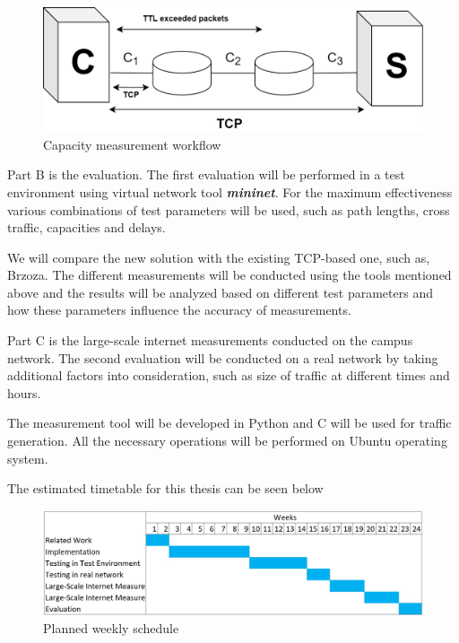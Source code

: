 \documentclass[NET,a4,12pt,ngerman]{netforms}
\begin{document}
\begin{figure}[h]
    \centering
    \includegraphics[scale=0.25]{images/NetworkDiag.png}
    \caption{Capacity measurement workflow  }
    \label{fig:mesh1}
\end{figure}


Part B is the evaluation. 
The first evaluation will be performed in a test environment using virtual network tool \textbf{\textit{mininet}}\cite{mininet}. For the maximum effectiveness various combinations of test parameters will be used, such as path lengths, cross traffic, capacities and delays.


We will compare the new solution with the existing TCP-based one, such as, Brzoza\cite{BrzozaThesis}. The different measurements will be conducted using the tools mentioned above and the results will be analyzed based on different test parameters and how these parameters influence the accuracy of measurements. 

Part C is the large-scale internet measurements conducted on the campus network. 
The second evaluation will be conducted on a real network by taking additional factors into consideration, such as size of traffic at different times and hours. 

The measurement tool will be developed in Python and C will be used for traffic generation. All the necessary operations will be performed on Ubuntu operating system.

The estimated timetable for this thesis can be seen below\colon

\begin{figure}[h]
    \centering
    \includegraphics[scale=0.3]{images/GanttChart.jpg}
    \caption{Planned weekly schedule}
    \label{fig:mesh1}
\end{figure}
\end{document}
